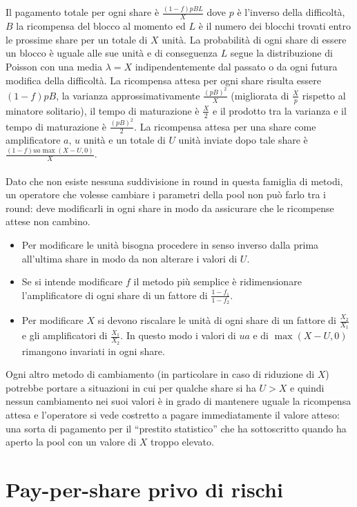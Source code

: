 Il pagamento totale per ogni share è $\frac{(1-f)pBL}{X}$ dove $p$ è l'inverso della difficoltà, $B$ la ricompensa del blocco al momento ed $L$ è il numero dei blocchi trovati entro le prossime share per un totale di $X$ unità. La probabilità di ogni share di essere un blocco è uguale alle sue unità e di conseguenza $L$ segue la distribuzione di Poisson con una media $\lambda = X$ indipendentemente dal passato o da ogni futura modifica della difficoltà. La ricompensa attesa per ogni share risulta essere $(1-f)pB$, la varianza approssimativamente $\frac{(pB)^2}{X}$ (migliorata di $\frac{X}{p}$ rispetto al minatore solitario), il tempo di maturazione è $\frac{X}{2}$ e il prodotto tra la varianza e il tempo di maturazione è $\frac{(pB)^2}{2}$.
La ricompensa attesa per una share come amplificatore $a$, $u$ unità e un totale di $U$ unità inviate dopo tale share è $\frac{(1-f)ua\max(X-U,0)}{X}$.\\\\
Dato che non esiste nessuna suddivisione in round in questa famiglia di metodi, un operatore che volesse cambiare i parametri della pool non può farlo tra i round: deve modificarli in ogni share in modo da assicurare che le ricompense attese non cambino.
\begin{itemize}
  \item Per modificare le unità bisogna procedere in senso inverso dalla prima all'ultima share in modo da non alterare i valori di $U$.
  \item Se si intende modificare $f$ il metodo più semplice è ridimensionare l'amplificatore di ogni share di un fattore di $\frac{1-f_1}{1-f_2}$.
  \item Per modificare $X$ si devono riscalare le unità di ogni share di un fattore di $\frac{X_2}{X_1}$ e gli amplificatori di $\frac{X_1}{X_2}$. In questo modo i valori di $ua$ e di $\max(X-U, 0)$ rimangono invariati in ogni share.
\end{itemize}
Ogni altro metodo di cambiamento (in particolare in caso di riduzione di $X$) potrebbe portare a situazioni in cui per qualche share si ha $U > X$ e quindi nessun cambiamento nei suoi valori è in grado di mantenere uguale la ricompensa attesa e l'operatore si vede costretto a pagare immediatamente il valore atteso: una sorta di pagamento per il ``prestito statistico'' che ha sottoscritto quando ha aperto la pool con un valore di $X$ troppo elevato.



\section{Pay-per-share privo di rischi}\label{pool-famiglia-mpps}

